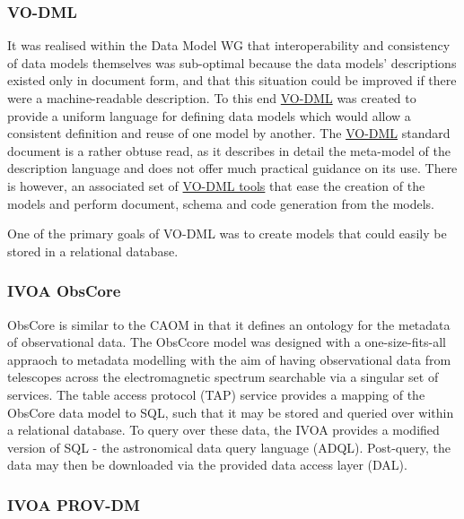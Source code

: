 \subsubsection{VO-DML}
It was realised within the Data Model WG that interoperability and consistency of data models themselves was sub-optimal because the data models' descriptions existed only in document form, and that this situation could be improved if there were a machine-readable description. To this end \href{https://www.ivoa.net/documents/VODML/}{VO-DML} was created to provide a uniform language for defining data models which would allow a consistent definition and reuse of one model by another. The \href{https://www.ivoa.net/documents/VODML/}{VO-DML} standard document is a rather obtuse read, as it describes in detail the meta-model of the description language and does not offer much practical guidance on its use. There is however, an associated set of \href{https://ivoa.github.io/vo-dml/}{VO-DML tools}
that ease the creation of the models and perform document, schema and code generation from the models.

One of the primary goals of VO-DML was to create models that could easily be stored in a relational database.



\subsubsection{IVOA ObsCore}

ObsCore is similar to the CAOM in that it defines an ontology for the metadata of observational data. 
The ObsCcore model was designed with a one-size-fits-all appraoch to metadata modelling with the aim of having observational data from telescopes across the electromagnetic spectrum searchable via a singular set of services.
The table access protocol (TAP) service provides a mapping of the ObsCore data model to SQL, such that it may be stored and queried over within a relational database. 
To query over these data, the IVOA provides a modified version of SQL - the astronomical data query language (ADQL). 
Post-query, the data may then be downloaded via the provided data access layer (DAL).

\subsubsection{IVOA PROV-DM}

